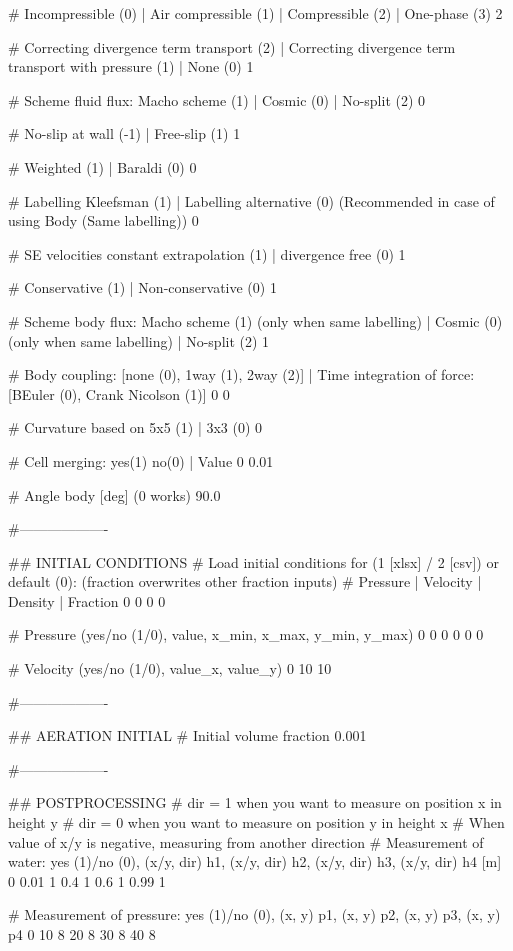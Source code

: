 # Incompressible (0)	| Air compressible (1)	| Compressible (2) | One-phase (3)
2

# Correcting divergence term transport (2) | Correcting divergence term transport with pressure (1) | None (0)
1

# Scheme fluid flux: Macho scheme (1)	|  Cosmic (0) | No-split (2)
0

# No-slip at wall (-1)	| Free-slip (1)
1

# Weighted (1) | Baraldi (0)
0

# Labelling Kleefsman (1) | Labelling alternative (0) (Recommended in case of using Body (Same labelling))
0

# SE velocities constant extrapolation (1) | divergence free (0)
1

# Conservative (1) | Non-conservative (0)
1

# Scheme body flux: Macho scheme (1) (only when same labelling) | Cosmic (0) (only when same labelling) | No-split (2)
1

# Body coupling: [none (0), 1way (1), 2way (2)] | Time integration of force: [BEuler (0), Crank Nicolson (1)]
0 0

# Curvature based on 5x5 (1) | 3x3 (0)
0

# Cell merging: yes(1) no(0) | Value
0 0.01

# Angle body [deg] (0 works)
90.0

#-------------------

## INITIAL CONDITIONS
# Load initial conditions for (1 [xlsx] / 2 [csv]) or default (0): (fraction overwrites other fraction inputs)
# Pressure 		| Velocity		| Density		| Fraction
0   0   0   0

# Pressure (yes/no (1/0), value, x_min, x_max, y_min, y_max)
0 0 0 0 0 0

# Velocity (yes/no (1/0), value_x, value_y)
0 10 10

#-------------------

## AERATION INITIAL
# Initial volume fraction
0.001

#-------------------

## POSTPROCESSING
# dir = 1 when you want to measure on position x in height y
# dir = 0 when you want to measure on position y in height x
# When value of x/y is negative, measuring from another direction
# Measurement of water: yes (1)/no (0), (x/y, dir) h1, (x/y, dir) h2, (x/y, dir) h3, (x/y, dir) h4 [m]
0   0.01 1  0.4 1  0.6 1  0.99 1

# Measurement of pressure: yes (1)/no (0), (x, y) p1, (x, y) p2, (x, y) p3, (x, y) p4
0	10 8	20 8     30 8	40 8


